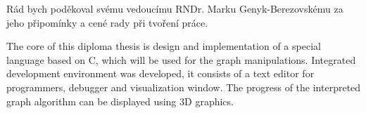 \documentclass[11pt,twoside,a4paper]{book}
\newcommand\TypeOfWork{Diplomová práce} %
\newcommand\StudProgram{Elektrotechnika a informatika, strukturovaný,\\Navazující magisterský}
\newcommand\StudBranch{Výpočetní technika}   %
\newcommand\WorkTitle{Interpret grafových algoritmů}
\newcommand\FirstandFamilyName{Bc. Michal Turek}
\newcommand\Supervisor{RNDr. Marko Genyk-Berezovskyj}
\begin{document}




\coverpagestarts



\acknowledgements
\noindent

\noindent Rád bych poděkoval svému vedoucímu RNDr. Marku Genyk-Berezovskému za jeho při\-po\-mín\-ky a cené rady při tvoření práce.






\abstractpage
The core of this diploma thesis is design and implementation of a special language based on C, which will be used for the graph manipulations. Integrated development environment was developed, it consists of a text editor for programmers, debugger and visualization window. The progress of the interpreted graph algorithm can be displayed using 3D graphics.
\end{document}
